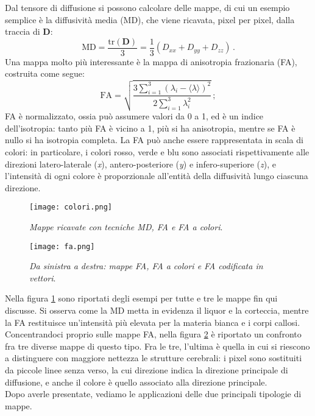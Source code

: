 \documentclass{report}
\newcommand{\figref}[1]{figura \ref{#1}}
\numberwithin{equation}{section}
\numberwithin{figure}{section}
\renewcommand{\Vec}{\bm}
\begin{document}
Dal tensore di diffusione si possono calcolare delle mappe, di cui un esempio semplice è la diffusività media (MD), che viene ricavata, pixel per pixel, dalla traccia di $\Vec{D}$:
\begin{equation}
    \text{MD} = \frac{\text{tr}(\Vec{D})}{3} = \frac{1}{3}\left(D_{xx} + D_{yy} + D_{zz}\right)\,.
\end{equation}
Una mappa molto più interessante è la mappa di anisotropia frazionaria (FA), costruita come segue:
\begin{equation}
    \text{FA} = \sqrt{\frac{3 \sum_{i=1}^3 (\lambda_i - \langle \lambda \rangle)^2}{2 \sum_{i=1}^3 \lambda_i^2}}\,;
\end{equation}
FA è normalizzato, ossia può assumere valori da 0 a 1, ed è un indice dell'isotropia: tanto più FA è vicino a 1, più si ha anisotropia, mentre se FA è nullo si ha isotropia completa. La FA può anche essere rappresentata in scala di colori: in particolare, i colori rosso, verde e blu sono associati rispettivamente alle direzioni latero-laterale (\textit{x}), antero-posteriore (\textit{y}) e infero-superiore (\textit{z}), e l'intensità di ogni colore è proporzionale all'entità della diffusività lungo ciascuna direzione.

\begin{figure}[htp]
\centering
\texttt{[image: colori.png]}
\caption{\label{fig:colori} \textit{Mappe ricavate con tecniche MD, FA e FA a colori}.}
\end{figure}

\begin{figure}[htp]
\centering
\texttt{[image: fa.png]}
\caption{\label{fig:fa} \textit{Da sinistra a destra: mappe FA, FA a colori e FA codificata in vettori}.}
\end{figure}

\noindent Nella \figref{fig:colori} sono riportati degli esempi per tutte e tre le mappe fin qui discusse. Si osserva come la MD metta in evidenza il liquor e la corteccia, mentre la FA restituisce un'intensità più elevata per la materia bianca e i corpi callosi. Concentrandoci proprio sulle mappe FA, nella \figref{fig:fa} è riportato un confronto fra tre diverse mappe di questo tipo. Fra le tre, l'ultima è quella in cui si riescono a distinguere con maggiore nettezza le strutture cerebrali: i pixel sono sostituiti da piccole linee senza verso, la cui direzione indica la direzione principale di diffusione, e anche il colore è quello associato alla direzione principale.\\
Dopo averle presentate, vediamo le applicazioni delle due principali tipologie di mappe.
\end{document}
